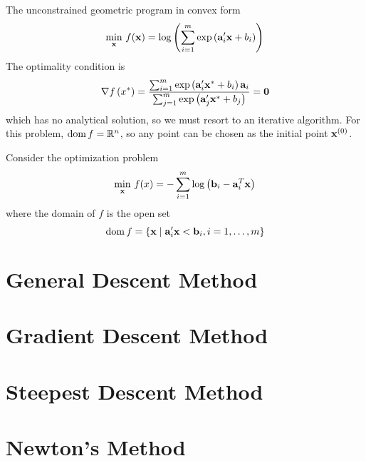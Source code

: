 \begin{example}
	The unconstrained geometric program in convex form
	\begin{equation*}
		\min_{\mathbf{x}}\,f(\mathbf{x})=\log \left(\sum_{i=1}^{m}\exp\left(\mathbf{a}_{i}^{\prime}\mathbf{x}+b_{i}\right)\right)
	\end{equation*}
	The optimality condition is
	\begin{equation*}
		\nabla f\left(x^{*}\right)=\frac{\sum_{i=1}^{m}\exp\left(\mathbf{a}_{i}^{\prime}\mathbf{x}^{*}+b_{i}\right)\mathbf{a}_{i}}{\sum_{j=1}^{m}\exp\left(\mathbf{a}_{j}^{\prime}\mathbf{x}^{*}+b_{j}\right)}=\mathbf{0}
	\end{equation*}
	which has no analytical solution, so we must resort to an iterative algorithm. For this problem, \(\operatorname{dom} f=\mathbb{R}^{n}\), so any point can be chosen as the initial point \(\mathbf{x}^{(0)}\).
\end{example}

\begin{example}
	Consider the optimization problem
	\begin{equation*}
		\min_{\mathbf{x}}\,f(x)=-\sum_{i=1}^{m}\log\left(\mathbf{b}_{i}-\mathbf{a}_{i}^{T}\mathbf{x}\right)
	\end{equation*}
	where the domain of \(f\) is the open set
	\begin{equation*}
		\operatorname{dom}f=\left\{\mathbf{x}\mid\mathbf{a}_{i}^{\prime}\mathbf{x}<\mathbf{b}_{i},i=1,\ldots,m\right\}
	\end{equation*}
\end{example}

\begin{definition}

\end{definition}

\section{General Descent Method}

\section{Gradient Descent Method}

\section{Steepest Descent Method}

\section{Newton's Method}

